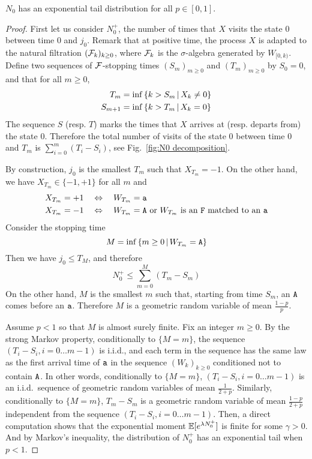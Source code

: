 \documentclass[a4paper]{article}
\begin{document}
\begin{prop}\label{lemma:exponential tail}
$N_0$ has an exponential tail distribution for all $p\in[0,1]$.
\end{prop}

\begin{proof}
First let us consider $N_0^+$,
the number of times that $X$ visits the state $0$ between time $0$ and $j_0$.
Remark that at positive time, the process $X$ is adapted to the natural filtration $(\mathcal{F}_k)_{k\geq 0}$, where $\mathcal{F}_k$ is the $\sigma$-algebra generated by $W_{[0,k)}$.
Define two sequences of $\mathcal{F}$-stopping times $(S_m)_{m\geq 0}$ and $(T_m)_{m\geq 0}$ by $S_0 = 0$, and that for all $m\geq 0$,
\begin{align*}
	T_m		&= \inf\left\{k>S_m\,\middle|\,X_k\neq 0\right\}
\\	S_{m+1} &= \inf\left\{k>T_m\,\middle|\,X_k	=  0\right\}
\end{align*}
The sequence $S$ (resp. $T$) marks the times that $X$ arrives at (resp. departs from) the state $0$.
Therefore the total number of visits of the state $0$ between time $0$ and $T_m$ is
$\sum_{i=0}^{m} (T_i - S_i)$,
see Fig.~\ref{fig:N0 decomposition}.

By construction, $j_0$ is the smallest $T_m$ such that $X_{T_m} = -1$.
On the other hand, we have $X_{T_m}\!\! \in\{-1,+1\}$ for all $m$ and 
\begin{align*}
	X_{T_m} =+1	\quad	&\iff\quad	W_{T_m} = \xa 			\label{eq:+1 = a}
\\	X_{T_m} =-1 \quad	&\iff\quad	W_{T_m} = \xA\text{ or }
									W_{T_m} \text{ is an } \xF \text{ matched to an } \xa
\end{align*}
Consider the stopping time
\begin{equation}\label{eq:def M}
	M=\inf\set{m\geq 0}{W_{T_m}=\xA}
\end{equation}
Then we have $j_0\leq T_M$, and therefore
\begin{equation}
	N_0^+ \leq \sum_{m=0}^M (T_m - S_m)
\end{equation}
On the other hand, $M$ is the smallest $m$ such that, starting from time $S_m$, an $\mathtt{A}$ comes before an $\mathtt{a}$.
Therefore $M$ is a geometric random variable of mean $\frac{1-p}{p}$.

Assume $p<1$ so that $M$ is almost surely finite.
Fix an integer $m\geq 0$.
By the strong Markov property, conditionally to $\{M=m\}$,
the sequence $(T_i-S_i, i=0\ldots m-1)$ is i.i.d.,
and each term in the sequence has the same law as the first arrival time
of $\mathtt{a}$ in the sequence $(W_k)_{k\geq 0}$ conditioned not to contain $\mathtt{A}$.
In other words, conditionally to $\{M=m\}$, $(T_i-S_i, i=0\ldots m-1)$ is
an i.i.d.\ sequence of geometric random variables of mean $\frac{1}{2+p}$.
Similarly, conditionally to $\{M=m\}$,
$T_m-S_m$ is a geometric random variable of mean $\frac{1-p}{2+p}$ independent from the sequence $(T_i-S_i, i=0\ldots m-1)$.
Then, a direct computation shows that the exponential moment ${\mathbb{E}}[e^{\lambda N_0^+}]$ is finite for some $\gamma>0$.
And by Markov's inequality, the distribution of $N_0^+$ has an exponential tail when $p<1$.


\end{proof}
\end{document}
